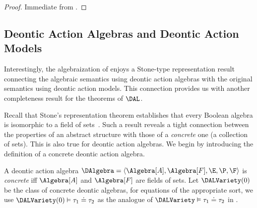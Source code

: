 
\begin{proof}
	Immediate from .
\end{proof}


\subsection{Deontic Action Algebras and Deontic Action Models}

Interestingly, the algebraization of \DAL enjoys a Stone-type representation result connecting the algebraic semantics using deontic action algebras with the original semantics using deontic action models.
This connection provides us with another completeness result for the theorems of $\DAL$.

Recall that Stone's representation theorem establishes that every Boolean algebra is isomorphic to a field of sets~\cite{Stone36}. Such a result reveals a tight connection between the properties of an abstract structure with those of a \emph{concrete} one (a collection of sets).
This is also true for deontic action algebras.
We begin by introducing the definition of a concrete deontic action algebra.


\medskip
\begin{definition}
	A deontic action algebra $\DAlgebra = \langle \Algebra[A], \Algebra[F],  \E, \P, \F \rangle$ is \emph{concrete} iff $\Algebra[A]$ and $\Algebra[F]$ are fields of sets.
  	Let $\DALVariety(0)$ be the class of concrete deontic algebras, for equations of the appropriate sort, we use $\DALVariety(0) \vDash \tau_1 \doteq \tau_2$ as the analogue of $\DALVariety \vDash \tau_1 \doteq \tau_2$ in .
\end{definition}
\medskip

